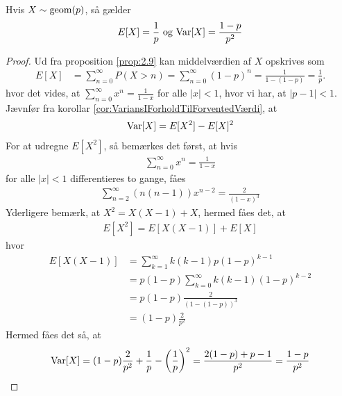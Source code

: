 \begin{prop} %
\label{prop:geomEgenskaber}
Hvis $X \sim \textnormal{geom} (p)$, så gælder 
\begin{align*}
    E[X] = \frac{1}{p} \text{ og } \textnormal{Var}[X] = \frac{1-p}{p^2}
\end{align*}
\end{prop}

\begin{proof}
    Ud fra proposition \ref{prop:2.9} kan middelværdien af $X$ opskrives som
    \begin{align*}
      E[X] &= \sum_{n=0}^{\infty} P(X > n) =\sum_{n=0}^\infty(1-p)^n=\frac{1}{1-(1-p)}=\frac{1}{p}.
    \end{align*}
    hvor det vides, at $\sum_{n=0}^\infty x^n=\frac{1}{1-x}$ for alle $|x|<1$, hvor vi har, at $|p-1|<1$.\\
    Jævnfør fra korollar \ref{cor:VariansIForholdTilForventedVærdi}, at
    \begin{align*}
        \textnormal{Var}[X] =E[X^2]-E[X]^2
    \end{align*}    
    For at udregne $E[X^2]$, så bemærkes det først, at hvis
    \begin{align*}
        \sum^\infty_{n=0}x^n=\frac{1}{1-x}
    \end{align*}
    for alle $|x|<1$ differentieres to gange, fåes 
    \begin{align*}
        \sum^\infty_{n=2}(n(n-1))x^{n-2}=\frac{2}{(1-x)^3}
    \end{align*}
    Yderligere bemærk, at $X^2=X(X-1)+X$, hermed fåes det, at
    \begin{align*}
        E[X^2]=E[X(X-1)]+E[X]
    \end{align*}
    hvor 
    \begin{align*}
        E[X(X-1)]&= \sum_{k=1}^{\infty}k(k-1)p(1-p)^{k-1}\\
        &= p(1-p)\sum_{k=0}^{\infty}k(k-1)(1-p)^{k-2}\\
        &=p(1-p)\frac{2}{(1-(1-p))^3}
        \\
        &=(1-p)\frac{2}{p^2}
    \end{align*}
    Hermed fåes det så, at
    \begin{align*}
        \textnormal{Var}[X]=(1-p)\frac{2}{p^2}+\frac{1}{p}-\left(\frac{1}{p}\right)^2
        =\frac{2(1-p)+p-1}{p^2}
        =\frac{1-p}{p^2}
    \end{align*}

\end{proof}
